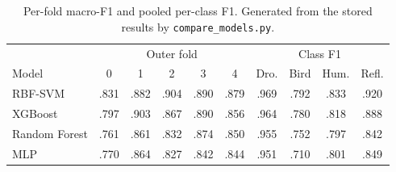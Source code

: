 \begin{table}[t]
\centering
\caption{Per-fold macro-F1 and pooled per-class F1. Generated from the stored results by \texttt{compare\_models.py}.}
\label{tab:fold}
\footnotesize
\setlength{\tabcolsep}{3pt}
\begin{tabular}{lccccc|cccc}
\toprule
& \multicolumn{5}{c|}{Outer fold} & \multicolumn{4}{c}{Class F1} \\
Model & 0 & 1 & 2 & 3 & 4 & Dro. & Bird & Hum. & Refl. \\
\midrule
RBF-SVM & .831 & .882 & .904 & .890 & .879 & .969 & .792 & .833 & .920 \\
XGBoost & .797 & .903 & .867 & .890 & .856 & .964 & .780 & .818 & .888 \\
Random Forest & .761 & .861 & .832 & .874 & .850 & .955 & .752 & .797 & .842 \\
MLP & .770 & .864 & .827 & .842 & .844 & .951 & .710 & .801 & .849 \\
\bottomrule
\end{tabular}
\end{table}
